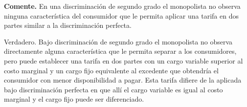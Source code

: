 \begin{parts}
\begin{solution}
\end{solution}
\end{parts}

\question \textbf{Comente.} En una discriminación de segundo grado el monopolista no observa ninguna característica del consumidor que le permita aplicar una tarifa en dos partes similar a la discriminación perfecta.
\begin{solution}
Verdadero. Bajo discriminación de segundo grado el monopolista no observa directamente alguna característica que le permita separar a los consumidores, pero puede establecer una tarifa en dos partes con un cargo variable superior al costo marginal y un cargo fijo equivalente al excedente que obtendría el consumidor con menor disponibilidad a pagar. Esta tarifa difiere de la aplicada bajo discriminación perfecta en que allí el cargo variable es igual al costo marginal y el cargo fijo puede ser diferenciado.

\end{solution}

